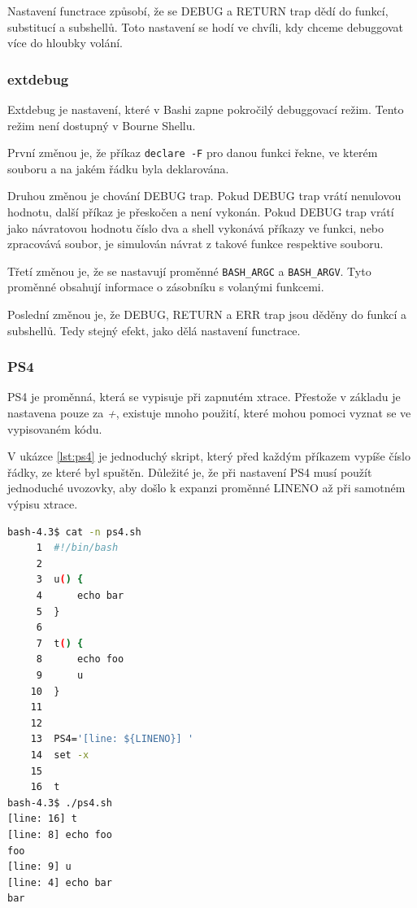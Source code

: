 \documentclass[thesis=M,czech]{FITthesis}[2012/06/26]
\begin{document}
Nastavení functrace způsobí, že se DEBUG a RETURN trap dědí do funkcí, substitucí a subshellů. Toto nastavení se hodí ve chvíli, kdy chceme debuggovat více do hloubky volání.

%
%
%
\subsubsection{extdebug}

Extdebug je nastavení, které v Bashi zapne pokročilý debuggovací režim. Tento režim není dostupný v Bourne Shellu.

První změnou je, že příkaz \texttt{declare -F} pro danou funkci řekne, ve kterém souboru a na jakém řádku byla deklarována.

Druhou změnou je chování DEBUG trap. Pokud DEBUG trap vrátí nenulovou hodnotu, další příkaz je přeskočen a není vykonán. Pokud DEBUG trap vrátí jako návratovou hodnotu číslo dva a shell vykonává příkazy ve funkci, nebo zpracovává soubor, je simulován návrat z takové funkce respektive souboru.

Třetí změnou je, že se nastavují proměnné \texttt{BASH\_ARGC} a \texttt{BASH\_ARGV}. Tyto proměnné obsahují informace o zásobníku s volanými funkcemi.

Poslední změnou je, že DEBUG, RETURN a ERR trap jsou děděny do funkcí a subshellů. Tedy stejný efekt, jako dělá nastavení functrace.

%
%
%
\subsubsection{PS4}
PS4 je proměnná, která se vypisuje při zapnutém xtrace. Přestože v základu je nastavena pouze za \textit{+}, existuje mnoho použití, které mohou pomoci vyznat se ve vypisovaném kódu.

V ukázce \ref{lst:ps4} je jednoduchý skript, který před každým příkazem vypíše číslo řádky, ze které byl spuštěn. Důležité je, že při nastavení PS4 musí použít jednoduché uvozovky, aby došlo k expanzi proměnné LINENO až při samotném výpisu xtrace.

\begin{minipage}{\linewidth}
\begin{lstlisting}[language=bash, caption={ps4}, label={lst:ps4}]
bash-4.3$ cat -n ps4.sh
     1	#!/bin/bash
     2
     3	u() {
     4		echo bar
     5	}
     6
     7	t() {
     8		echo foo
     9		u
    10	}
    11
    12
    13	PS4='[line: ${LINENO}] '
    14	set -x
    15
    16	t
bash-4.3$ ./ps4.sh
[line: 16] t
[line: 8] echo foo
foo
[line: 9] u
[line: 4] echo bar
bar
\end{lstlisting}
\end{minipage}
\end{document}
